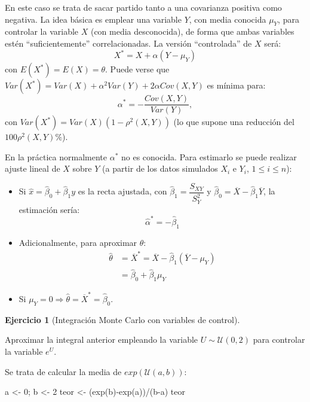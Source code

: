 \documentclass[
]{book}
\newenvironment{Shaded}{\begin{snugshade}}{\end{snugshade}}
\newcommand{\DecValTok}[1]{\textcolor[rgb]{0.00,0.00,0.81}{#1}}
\newcommand{\FunctionTok}[1]{\textcolor[rgb]{0.00,0.00,0.00}{#1}}
\newcommand{\NormalTok}[1]{#1}
\newcommand{\OtherTok}[1]{\textcolor[rgb]{0.56,0.35,0.01}{#1}}
\newcommand{\SpecialCharTok}[1]{\textcolor[rgb]{0.00,0.00,0.00}{#1}}
\theoremstyle{break}
\theoremstyle{definition}
\theoremstyle{definition}
\theoremstyle{definition}
\newtheorem{exercise}{Ejercicio}[chapter]
\theoremstyle{definition}
\theoremstyle{remark}
\begin{document}
En este caso se trata de sacar partido tanto a una covarianza
positiva como negativa.
La idea básica es emplear una variable \(Y\), con media conocida
\(\mu_{Y}\), para controlar la variable \(X\) (con media desconocida),
de forma que ambas variables estén ``suficientemente'' correlacionadas.
La versión ``controlada'' de \(X\) será:
\[X^{\ast}=X+\alpha \left(  Y-\mu_{Y}\right)\]
con \(E(X^{\ast})=E(X)=\theta\).
Puede verse que
\(Var(X^{\ast})=Var(X)+\alpha^{2}Var(Y)+2\alpha Cov(X,Y)\)
es mínima para:
\[\alpha^{\ast}=-\frac{Cov(X,Y)}{Var(Y)},\]
con \(Var(X^{\ast}) = Var(X) \left( 1-\rho^{2} \left( X, Y \right) \right)\)
(lo que supone una reducción del \(100\rho^{2}\left( X, Y \right) \%\)).

En la práctica normalmente \(\alpha^{\ast}\) no es conocida.
Para estimarlo se puede realizar ajuste lineal de \(X\) sobre \(Y\)
(a partir de los datos simulados \(X_{i}\) e \(Y_{i}\), \(1\leq i\leq n\)):

\begin{itemize}
\item
  Si \(\hat{x}=\hat{\beta}_{0}+\hat{\beta}_{1}y\) es la recta ajustada, con
  \(\hat{\beta}_{1} = \dfrac{S_{XY}}{S_{Y}^{2}}\) y
  \(\hat{\beta}_{0} = \overline{X}-\hat{\beta}_{1}\overline{Y}\),
  la estimación sería:
  \[\hat{\alpha}^{\ast}=-\hat{\beta}_{1}\]
\item
  Adicionalmente, para aproximar \(\theta\):
  \[\begin{aligned}
  \hat{\theta} & =\overline{X}^{\ast}=\overline{X}-\hat{\beta}_{1}\left( \overline{Y}-\mu_{Y}\right) \\  
  & =\hat{\beta}_{0}+\hat{\beta}_{1}\mu_{Y}
  \end{aligned}\]
\item
  Si \(\mu_{Y}=0\Rightarrow \hat{\theta}=\overline{X}^{\ast}=\hat{\beta}_{0}\).
\end{itemize}

\begin{exercise}[Integración Monte Carlo con variables de control]
\protect\hypertarget{exr:mc-integral-contr}{}{\label{exr:mc-integral-contr} {} }
\end{exercise}

Aproximar la integral anterior empleando la variable \(U\sim\mathcal{U}(0,2)\) para controlar la variable \(e^{U}\).

Se trata de calcular la media de \(exp(\mathcal{U}(a,b))\):

\begin{Shaded}
\begin{Highlighting}[]
\NormalTok{a }\OtherTok{\textless{}{-}} \DecValTok{0}\NormalTok{; b }\OtherTok{\textless{}{-}} \DecValTok{2}
\NormalTok{teor }\OtherTok{\textless{}{-}}\NormalTok{ (}\FunctionTok{exp}\NormalTok{(b)}\SpecialCharTok{{-}}\FunctionTok{exp}\NormalTok{(a))}\SpecialCharTok{/}\NormalTok{(b}\SpecialCharTok{{-}}\NormalTok{a)}
\NormalTok{teor}
\end{Highlighting}
\end{Shaded}
\end{document}
